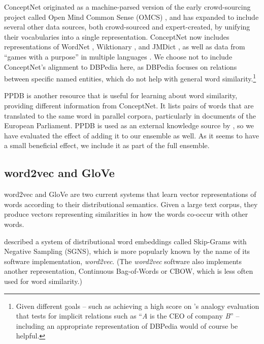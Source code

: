 \documentclass[11pt,letterpaper]{article}
\begin{document}
ConceptNet originated as a machine-parsed version of the early crowd-sourcing
project called Open Mind Common Sense (OMCS) \cite{singh2002omcs}, and has expanded
to include several other data sources, both crowd-sourced and expert-created,
by unifying their vocabularies into a single representation. ConceptNet now includes
representations of WordNet \cite{miller1998wordnet}, Wiktionary \cite{wiktionary2014en},
and JMDict \cite{breen2004jmdict}, as well as data from ``games with a purpose'' in
multiple languages \cite{vonahn2006verbosity,kuo2009petgame,nakahara2011nadya}.
We choose not to include ConceptNet's alignment to DBPedia
\cite{auer2007dbpedia}
here, as DBPedia focuses on relations between specific named entities, which do not help
with general word similarity.\footnote{
    Given different goals -- such as achieving a high score on
    's analogy evaluation that tests for
    implicit relations such as ``{\em A} is the CEO of company {\em B}'' --
    including an appropriate representation of DBPedia would of course be helpful.
}

PPDB \cite{ganitkevitch2013ppdb} is another resource that is useful for
learning about word similarity, providing different information from
ConceptNet. It lists pairs of words that are translated to the same word in parallel
corpora, particularly in documents of the European Parliament. PPDB is used
as an external knowledge source by , so
we have evaluated the effect of adding it to our ensemble as well. As it seems to have
a small beneficial effect, we include it as part of the full ensemble.

\subsection{word2vec and GloVe}

word2vec and GloVe are two current systems that learn vector representations
of words according to their distributional semantics. Given a large text corpus,
they produce vectors representing similarities in how the words co-occur with
other words.

 described a system of distributional word
embeddings called Skip-Grams with Negative Sampling (SGNS), which is more
popularly known by the name of its software implementation, {\em word2vec}.
(The {\em word2vec} software also implements another representation, Continuous
Bag-of-Words or CBOW, which is less often used for word similarity.)
\end{document}

